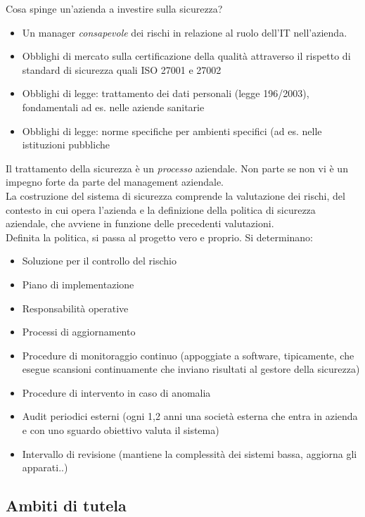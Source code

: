 Cosa spinge un'azienda a investire sulla sicurezza?

\begin{itemize}

\item
  Un manager \emph{consapevole} dei rischi in relazione al ruolo dell'IT
  nell'azienda.\\
\item
  Obblighi di mercato sulla certificazione della qualit\`a attraverso il
  rispetto di standard di sicurezza quali ISO 27001 e 27002
\item
  Obblighi di legge: trattamento dei dati personali (legge 196/2003),
  fondamentali ad es. nelle aziende sanitarie
\item
  Obblighi di legge: norme specifiche per ambienti specifici (ad es.
  nelle istituzioni pubbliche
\end{itemize}
Il trattamento della sicurezza \`e un \emph{processo} aziendale. Non parte
se non vi \`e un impegno forte da parte del management aziendale.\\
La costruzione del sistema di sicurezza comprende la valutazione dei
rischi, del contesto in cui opera l'azienda e la definizione della
politica di sicurezza aziendale, che avviene in funzione delle
precedenti valutazioni.\\
Definita la politica, si passa al progetto vero e proprio. Si
determinano:

\begin{itemize}

\item
  Soluzione per il controllo del rischio
\item
  Piano di implementazione
\item
  Responsabilit\`a operative
\item
  Processi di aggiornamento
\item
  Procedure di monitoraggio continuo (appoggiate a software, tipicamente, che
  esegue scansioni continuamente che inviano risultati al gestore della
  sicurezza)
\item
  Procedure di intervento in caso di anomalia
\item
  Audit periodici esterni (ogni 1,2 anni una societ\`a esterna che entra
  in azienda e con uno sguardo obiettivo valuta il sistema)
\item
  Intervallo di revisione (mantiene la complessit\`a dei sistemi bassa,
  aggiorna gli apparati..)
\end{itemize}

\subsection{Ambiti di tutela}

